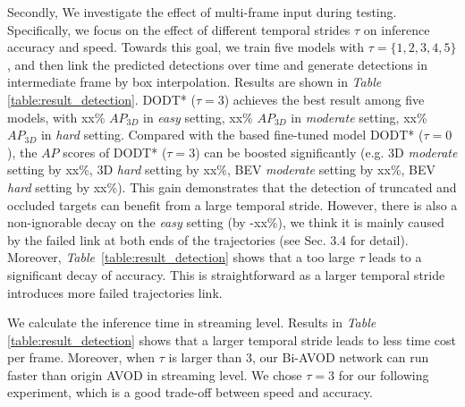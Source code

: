 \documentclass[letterpaper, 10 pt, conference]{ieeeconf}  %
\def\tablename{\emph{Table}}
\begin{document}
Secondly, We investigate the effect of multi-frame input during testing. Specifically, we focus on the effect of different temporal strides $\tau$  on inference accuracy and speed. Towards this goal, we train five models with $\tau = \{1, 2, 3, 4, 5\}$, and then link the predicted detections over time and generate detections in intermediate frame by box interpolation. Results are shown in \tablename \, \ref{table:result_detection}. DODT* ($\tau = 3$) achieves the best result among five models, with xx\% $AP_{3D}$ in \textit{easy} setting, xx\% $AP_{3D}$ in \textit{moderate} setting, xx\% $AP_{3D}$ in \textit{hard} setting. Compared with the based fine-tuned model DODT* ($\tau = 0$), the $AP$ scores of DODT* ($\tau = 3$) can be boosted significantly (e.g. 3D \textit{moderate} setting by xx\%, 3D \textit{hard} setting by xx\%, BEV \textit{moderate} setting by xx\%, BEV \textit{hard} setting by xx\%). This gain demonstrates that the detection of truncated and occluded targets can benefit from a large temporal stride. However, there is also a non-ignorable decay on the \textit{easy} setting (by -xx\%), we think it is mainly caused by the failed link at both ends of the trajectories (see Sec. 3.4 for detail). Moreover,  \tablename \, \ref{table:result_detection} shows that a too large $\tau$ leads to a significant decay of accuracy. This is straightforward as a larger temporal stride introduces more failed trajectories link.

We calculate the inference time in streaming level. Results in  \tablename \, \ref{table:result_detection} shows that a larger temporal stride leads to less time cost per frame. Moreover, when $\tau$ is larger than 3, our Bi-AVOD network can run faster than origin AVOD in streaming level. We chose $\tau = 3$ for our following experiment, which is a good trade-off between speed and accuracy.

\begin{table}
	\caption{Tracking performance comparison of origin AVOD and our Bi-AVOD on KITTI tracking evaluation datasets.}
	\label{label:result_tracking}
\end{table}
\end{document}
